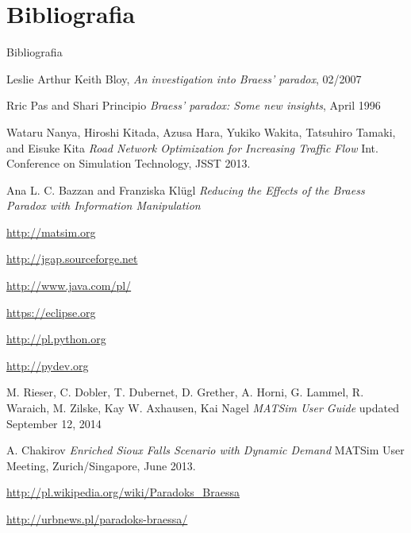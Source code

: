 \documentclass{beamer}
\begin{document}
\section{Bibliografia}
\begin{frame}[allowframebreaks]{Bibliografia}
\begin{thebibliography}{10}

	Leslie Arthur Keith Bloy, 
	\newblock \textit{An investigation into Braess’ paradox}, 02/2007

	Rric Pas and Shari Principio
	\newblock \textit{Braess’ paradox: Some new insights}, April 1996

	Wataru Nanya, Hiroshi Kitada, Azusa Hara, Yukiko Wakita, Tatsuhiro Tamaki, and Eisuke Kita
	\newblock \textit{Road Network Optimization for Increasing Traffic Flow}
	\newblock Int. Conference on Simulation Technology, JSST 2013.

	Ana L. C. Bazzan and Franziska Klügl
	\newblock \textit{Reducing the Effects of the Braess Paradox with Information Manipulation}


\framebreak

	\url{http://matsim.org}	

	\url{http://jgap.sourceforge.net}

	\url{http://www.java.com/pl/}

	\url{https://eclipse.org}
				
	\url{http://pl.python.org}
	
	\url{http://pydev.org}

\framebreak

	M. Rieser, C. Dobler, T. Dubernet, D. Grether, A. Horni, G. Lammel, R. Waraich, M. Zilske, Kay W. Axhausen, Kai Nagel
	\newblock \textit{MATSim User Guide}
	\newblock updated September 12, 2014

	A. Chakirov
	\newblock \textit{Enriched Sioux Falls Scenario with Dynamic Demand}
	\newblock MATSim User Meeting, Zurich/Singapore, June 2013.
	
	\url{http://pl.wikipedia.org/wiki/Paradoks_Braessa}
	
	\url{http://urbnews.pl/paradoks-braessa/}
		
\end{thebibliography}
\end{frame}
\end{document}
